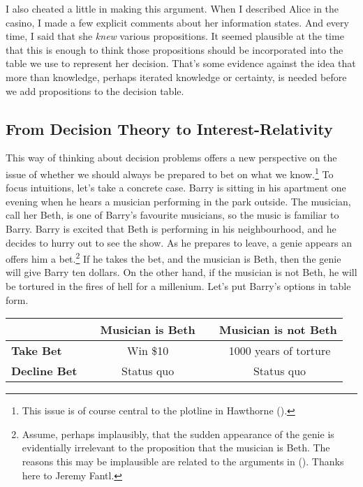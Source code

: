 \documentclass[
  10pt,
  letterpaper,
  DIV=11,
  numbers=noendperiod,
  twoside]{scrartcl}
\begin{document}
I also cheated a little in making this argument. When I described Alice
in the casino, I made a few explicit comments about her information
states. And every time, I said that she \emph{knew} various
propositions. It seemed plausible at the time that this is enough to
think those propositions should be incorporated into the table we use to
represent her decision. That's some evidence against the idea that more
than knowledge, perhaps iterated knowledge or certainty, is needed
before we add propositions to the decision table.

\subsection{From Decision Theory to
Interest-Relativity}\label{from-decision-theory-to-interest-relativity}

This way of thinking about decision problems offers a new perspective on
the issue of whether we should always be prepared to bet on what we
know.\footnote{This issue is of course central to the plotline in
  Hawthorne ().} To focus intuitions,
let's take a concrete case. Barry is sitting in his apartment one
evening when he hears a musician performing in the park outside. The
musician, call her Beth, is one of Barry's favourite musicians, so the
music is familiar to Barry. Barry is excited that Beth is performing in
his neighbourhood, and he decides to hurry out to see the show. As he
prepares to leave, a genie appears an offers him a bet.\footnote{Assume,
  perhaps implausibly, that the sudden appearance of the genie is
  evidentially irrelevant to the proposition that the musician is Beth.
  The reasons this may be implausible are related to the arguments in
  (). Thanks here to
  Jeremy Fantl.} If he takes the bet, and the musician is Beth, then the
genie will give Barry ten dollars. On the other hand, if the musician is
not Beth, he will be tortured in the fires of hell for a millenium.
Let's put Barry's options in table form.

\begin{longtable}[]{@{}lcc@{}}
\toprule\noalign{}
~ & ~\textbf{Musician is Beth}~ & ~\textbf{Musician is not Beth} \\
\midrule\noalign{}
\endhead
\bottomrule\noalign{}
\endlastfoot
\textbf{Take Bet} ~ & ~ Win \$10 ~ & ~ 1000 years of torture \\
\textbf{Decline Bet}~ & ~ Status quo ~ & ~ Status quo \\
\end{longtable}
\end{document}
